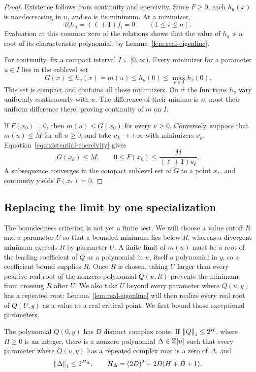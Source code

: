 \begin{proof}
Existence follows from continuity and coercivity.  Since $F\ge0$, each
$h_u(x)$ is nondecreasing in $u$, and so is its minimum.  At a minimizer,
\[
 \partial_i h_u=(\ell+1)f_i=0\qquad(1\le i\le n).
\]
Evaluation at this common zero of the relations shows that the value of
$h_u$ is a root of its characteristic polynomial, by
Lemma~\ref{lem:real-eigenline}.

For continuity, fix a compact interval $I\subseteq[0,\infty)$.  Every
minimizer for a parameter $u\in I$ lies in the sublevel set
\[
 G(x)\le h_u(x)=m(u)\le h_u(0)
 \le\max_{v\in I}h_v(0).
\]
This set is compact and contains all these minimizers.  On it the
functions $h_u$ vary uniformly continuously with $u$.  The difference
of their minima is at most their uniform difference there, proving
continuity of $m$ on $I$.

If $F(x_0)=0$, then $m(u)\le G(x_0)$ for every $u\ge0$.  Conversely,
suppose that $m(u)\le M$ for all $u\ge0$, and take $u_k\to+\infty$
with minimizers $x_k$.  Equation~\eqref{eq:existential-coercivity} gives
\[
 G(x_k)\le M,
 \qquad 0\le F(x_k)\le\frac{M}{(\ell+1)u_k}.
\]
A subsequence converges in the compact sublevel set of $G$ to a point
$x_*$, and continuity yields $F(x_*)=0$.
\end{proof}

\subsection{Replacing the limit by one specialization}

The boundedness criterion is not yet a finite test.  We will choose a
value cutoff $R$ and a parameter $U$ so that a bounded minimum lies below
$R$, whereas a divergent minimum exceeds $R$ by parameter $U$.  A
finite limit of $m(u)$ must be a root of the leading coefficient of $Q$
as a polynomial in $u$, itself a polynomial in $y$, so a coefficient
bound supplies $R$.  Once $R$ is chosen, taking $U$ larger
than every positive real root of the nonzero polynomial $Q(u,R)$
prevents the minimum from crossing $R$ after $U$.  We also take $U$
beyond every parameter where $Q(u,y)$ has a repeated root:
Lemma~\ref{lem:real-eigenline} will then realize every real root of
$Q(U,y)$ as a value at a real critical point.  We first bound those
exceptional parameters.

\begin{lemma}\label{lem:existential-discriminant}
The polynomial $Q(0,y)$ has $D$ distinct complex roots.  If
$\left\lVert Q\right\rVert_1\le2^H$, where $H\ge0$ is an integer, there is a nonzero
polynomial $\Delta\in\mathbb Z[u]$ such that every parameter where $Q(u,y)$
has a repeated complex root is a zero of $\Delta$, and
\begin{equation}\label{eq:existential-discriminant-bound}
 \left\lVert\Delta\right\rVert_1\le2^{H_\Delta},\qquad
 H_\Delta=(2D)^2+2D(H+D+1).
\end{equation}
\end{lemma}

